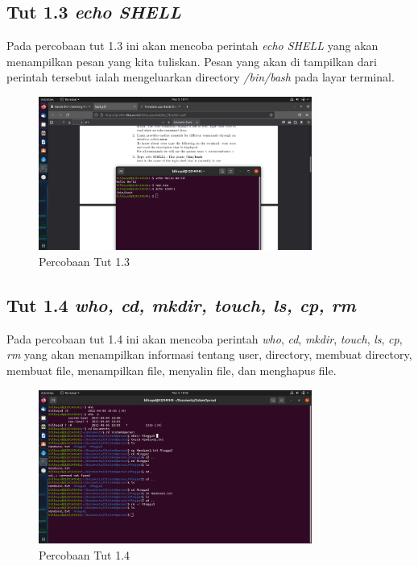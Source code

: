 \documentclass[11pt,a4paper]{article}
\begin{document}
\subsection{Tut 1.3 \textit{echo SHELL}}
	Pada percobaan tut 1.3 ini akan mencoba perintah \textit{echo SHELL} yang akan menampilkan pesan yang kita tuliskan. Pesan yang akan
	di tampilkan dari perintah tersebut ialah mengeluarkan directory \textit{/bin/bash} pada layar terminal.
	\begin{figure}[h]
		\centering
		\includegraphics[width=0.8\textwidth]{Figure/tut 1.3.png}
		\caption{Percobaan Tut 1.3}
	\end{figure}

\subsection{Tut 1.4 \textit{who, cd, mkdir, touch, ls, cp, rm}}
	Pada percobaan tut 1.4 ini akan mencoba perintah \textit{who}, \textit{cd}, \textit{mkdir}, \textit{touch}, \textit{ls}, \textit{cp}, 
	\textit{rm} yang akan menampilkan informasi tentang user, directory, membuat directory, membuat file, menampilkan file, 
	menyalin file, dan menghapus file.
	\begin{figure}[h]
		\centering
		\includegraphics[width=0.8\textwidth]{Figure/tut 1.4.png}
		\caption{Percobaan Tut 1.4}
	\end{figure}
\end{document}
